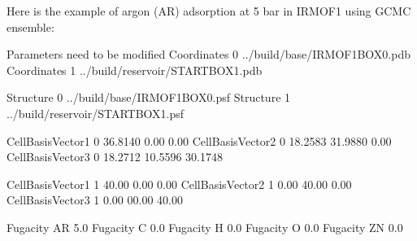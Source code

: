 \documentclass[letterpaper,10pt,english]{sphinxmanual}
\begin{document}
Here is the example of argon (AR) adsorption at 5 bar in IRMOF\sphinxhyphen{}1 using GCMC ensemble:

\begin{sphinxVerbatim}[commandchars=\\\{\}]
\PYGZsh{}\PYGZsh{}\PYGZsh{}\PYGZsh{}\PYGZsh{}\PYGZsh{}\PYGZsh{}\PYGZsh{}\PYGZsh{}\PYGZsh{}\PYGZsh{}\PYGZsh{}\PYGZsh{}\PYGZsh{}\PYGZsh{}\PYGZsh{}\PYGZsh{}\PYGZsh{}\PYGZsh{}\PYGZsh{}\PYGZsh{}\PYGZsh{}\PYGZsh{}\PYGZsh{}\PYGZsh{}\PYGZsh{}\PYGZsh{}\PYGZsh{}\PYGZsh{}\PYGZsh{}\PYGZsh{}\PYGZsh{}\PYGZsh{}\PYGZsh{}\PYGZsh{}\PYGZsh{}\PYGZsh{}\PYGZsh{}\PYGZsh{}\PYGZsh{}\PYGZsh{}\PYGZsh{}\PYGZsh{}\PYGZsh{}\PYGZsh{}\PYGZsh{}\PYGZsh{}\PYGZsh{}\PYGZsh{}\PYGZsh{}\PYGZsh{}\PYGZsh{}\PYGZsh{}\PYGZsh{}\PYGZsh{}\PYGZsh{}
\PYGZsh{} Parameters need to be modified
\PYGZsh{}\PYGZsh{}\PYGZsh{}\PYGZsh{}\PYGZsh{}\PYGZsh{}\PYGZsh{}\PYGZsh{}\PYGZsh{}\PYGZsh{}\PYGZsh{}\PYGZsh{}\PYGZsh{}\PYGZsh{}\PYGZsh{}\PYGZsh{}\PYGZsh{}\PYGZsh{}\PYGZsh{}\PYGZsh{}\PYGZsh{}\PYGZsh{}\PYGZsh{}\PYGZsh{}\PYGZsh{}\PYGZsh{}\PYGZsh{}\PYGZsh{}\PYGZsh{}\PYGZsh{}\PYGZsh{}\PYGZsh{}\PYGZsh{}\PYGZsh{}\PYGZsh{}\PYGZsh{}\PYGZsh{}\PYGZsh{}\PYGZsh{}\PYGZsh{}\PYGZsh{}\PYGZsh{}\PYGZsh{}\PYGZsh{}\PYGZsh{}\PYGZsh{}\PYGZsh{}\PYGZsh{}\PYGZsh{}\PYGZsh{}\PYGZsh{}\PYGZsh{}\PYGZsh{}\PYGZsh{}\PYGZsh{}\PYGZsh{}
Coordinates     0   ../build/base/IRMOF\PYGZus{}1\PYGZus{}BOX\PYGZus{}0.pdb
Coordinates     1   ../build/reservoir/START\PYGZus{}BOX\PYGZus{}1.pdb

Structure       0   ../build/base/IRMOF\PYGZus{}1\PYGZus{}BOX\PYGZus{}0.psf
Structure       1   ../build/reservoir/START\PYGZus{}BOX\PYGZus{}1.psf

CellBasisVector1    0   36.8140   0.00     0.00
CellBasisVector2    0   18.2583  31.9880   0.00
CellBasisVector3    0   18.2712  10.5596  30.1748

CellBasisVector1    1   40.00     0.00    0.00
CellBasisVector2    1    0.00    40.00    0.00
CellBasisVector3    1    0.00    00.00   40.00

Fugacity    AR      5.0
Fugacity    C       0.0
Fugacity    H       0.0
Fugacity    O       0.0
Fugacity    ZN      0.0
\end{sphinxVerbatim}
\end{document}
